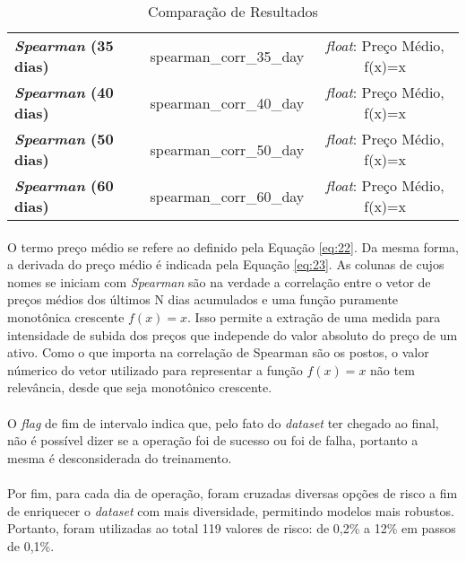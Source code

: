 \begin{table}[h!]
\begin{center}
\begin{tabular}{ l|c|c }
            \textbf{\textit{Spearman} (35 dias)} & spearman\_corr\_35\_day & \textit{float}: Preço Médio, f(x)=x \\
            \textbf{\textit{Spearman} (40 dias)} & spearman\_corr\_40\_day & \textit{float}: Preço Médio, f(x)=x \\
            \textbf{\textit{Spearman} (50 dias)} & spearman\_corr\_50\_day & \textit{float}: Preço Médio, f(x)=x \\
            \textbf{\textit{Spearman} (60 dias)} & spearman\_corr\_60\_day & \textit{float}: Preço Médio, f(x)=x \\
        \end{tabular}
        \caption{Comparação de Resultados}
        \label{tab:7}
    \end{center}
\end{table}

\paragraph{} O termo preço médio se refere ao definido pela Equação \ref{eq:22}. Da mesma forma, a derivada do preço médio é indicada pela Equação \ref{eq:23}. As colunas de cujos nomes se iniciam com \textit{Spearman} são na verdade a correlação entre o vetor de preços médios dos últimos N dias acumulados e uma função puramente monotônica crescente \begin{math} f(x) = x \end{math}. Isso permite a extração de uma medida para intensidade de subida dos preços que independe do valor absoluto do preço de um ativo. Como o que importa na correlação de Spearman são os postos, o valor númerico do vetor utilizado para representar a função \begin{math} f(x) = x \end{math} não tem relevância, desde que seja monotônico crescente.

\paragraph{} O \textit{flag} de fim de intervalo indica que, pelo fato do \textit{dataset} ter chegado ao final, não é possível dizer se a operação foi de sucesso ou foi de falha, portanto a mesma é desconsiderada do treinamento.

\paragraph{} Por fim, para cada dia de operação, foram cruzadas diversas opções de risco a fim de enriquecer o \textit{dataset} com mais diversidade, permitindo modelos mais robustos. Portanto, foram utilizadas ao total 119 valores de risco: de 0,2\% a 12\% em passos de 0,1\%.



